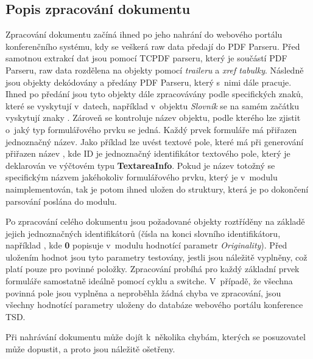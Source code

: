\subsection{Popis zpracování dokumentu}
Zpracování dokumentu začíná ihned po jeho nahrání do webového portálu konferenčního systému, kdy se veškerá raw data předají do PDF Parseru. Před samotnou extrakcí dat jsou pomocí TCPDF parseru, který je součástí PDF Parseru, raw data rozdělena na objekty pomocí \textit{traileru} a \textit{xref tabulky}. Následně jsou objekty dekódovány a předány PDF Parseru, který s~nimi dále pracuje. Ihned po předání jsou tyto objekty dále zpracovávány podle specifických znaků, které se vyskytují v~datech, například v~objektu \textit{Slovník} se na samém začátku vyskytují znaky \uv{<<}. Zároveň se kontroluje název objektu, podle kterého lze zjistit o~jaký typ formulářového prvku se jedná. Každý prvek formuláře má přiřazen jednoznačný název. Jako příklad lze uvést textové pole, které má při generování přiřazen název , kde ID je jednoznačný identifikátor textového pole, který je deklarován ve výčtovém typu \textbf{TextareaInfo}. Pokud je název totožný se specifickým názvem jakéhokoliv formulářového prvku, který je v~modulu naimplementován, tak je potom ihned uložen do struktury, která je po dokončení parsování poslána do modulu. 
\par
Po zpracování celého dokumentu jsou požadované objekty roztříděny na základě jejich jednoznačných identifikátorů (čísla na konci slovního identifikátoru, například , kde \textbf{0} popisuje v~modulu hodnotící parametr \textit{Originality}). Před uložením hodnot jsou tyto parametry testovány, jestli jsou náležitě vyplněny, což platí pouze pro povinné položky. Zpracování probíhá pro každý základní prvek formuláře samostatně ideálně pomocí cyklu a switche. V~případě, že všechna povinná pole jsou vyplněna a neproběhla žádná chyba ve zpracování, jsou všechny hodnotící parametry uloženy do databáze webového portálu konference TSD.
\par
Při nahrávání dokumentu může dojít k~několika chybám, kterých se posuzovatel může dopustit, a proto jsou náležitě ošetřeny.
